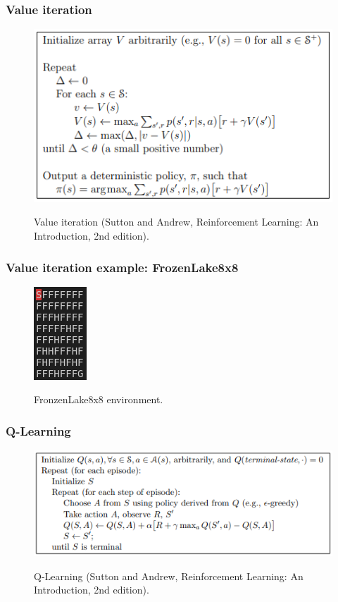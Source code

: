 \documentclass{beamer}
\begin{document}
        \begin{frame}
            \frametitle{Value iteration}
            \begin{figure}
                \centering
                \includegraphics[width=0.7\linewidth]{figures/value_iteration.png}
                \label{fig5:value}
                \caption{Value iteration (Sutton and Andrew, Reinforcement Learning: An Introduction, 2nd edition).}
            \end{figure}
        \end{frame}

        \begin{frame}
            \frametitle{Value iteration example: FrozenLake8x8}
            \begin{figure}
                \centering
                \includegraphics[width=0.2\linewidth]{figures/frozenlake8x8}
                \label{fig6:frozenlake8x8}
                \caption{FronzenLake8x8 environment.}
            \end{figure}
        \end{frame}

        \begin{frame}
            \frametitle{Q-Learning}
            \begin{figure}
                \centering
                \includegraphics[width=0.8\linewidth]{figures/q_learning.png}
                \label{fig6:q}
                \caption{Q-Learning (Sutton and Andrew, Reinforcement Learning: An Introduction, 2nd edition).}
            \end{figure}
        \end{frame}
\end{document}
